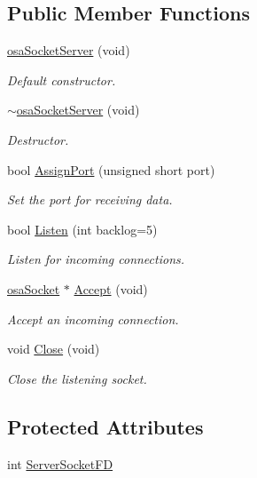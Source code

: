\subsection*{Public Member Functions}
\begin{DoxyCompactItemize}
\item 
\hyperlink{classosa_socket_server_a95442e75d0234966550256b8591fca55}{osa\+Socket\+Server} (void)
\begin{DoxyCompactList}\small\item\em Default constructor. \end{DoxyCompactList}\item 
\hyperlink{classosa_socket_server_a0e5b5e34967cd0bfe3ee80ba98f62fe5}{$\sim$osa\+Socket\+Server} (void)
\begin{DoxyCompactList}\small\item\em Destructor. \end{DoxyCompactList}\item 
bool \hyperlink{classosa_socket_server_a983f8c04e9683324095f6440d022e7fb}{Assign\+Port} (unsigned short port)
\begin{DoxyCompactList}\small\item\em Set the port for receiving data. \end{DoxyCompactList}\item 
bool \hyperlink{classosa_socket_server_a8a9d065ea83b82acdce8568d0e87610a}{Listen} (int backlog=5)
\begin{DoxyCompactList}\small\item\em Listen for incoming connections. \end{DoxyCompactList}\item 
\hyperlink{classosa_socket}{osa\+Socket} $\ast$ \hyperlink{classosa_socket_server_afb7c054b984fe086617dd17b65b20979}{Accept} (void)
\begin{DoxyCompactList}\small\item\em Accept an incoming connection. \end{DoxyCompactList}\item 
void \hyperlink{classosa_socket_server_aa3540c4c8fccdddde8b1b922bbb4dbba}{Close} (void)
\begin{DoxyCompactList}\small\item\em Close the listening socket. \end{DoxyCompactList}\end{DoxyCompactItemize}
\subsection*{Protected Attributes}
\begin{DoxyCompactItemize}
\item 
int \hyperlink{classosa_socket_server_ad540b1c7de4c8d402ea98c937a7d8832}{Server\+Socket\+F\+D}
\end{DoxyCompactItemize}


